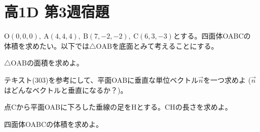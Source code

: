 \documentclass[dvipdfmx,uplatex,b5paper]{jsarticle}
\begin{document}
\section*{高1D 第3週宿題}
$\text{O}(0,0,0),\ \text{A}(4,4,4),\ \text{B}(7,-2,-2),\ \text{C}(6,3,-3)$とする。四面体OABCの
体積を求めたい。以下では$\triangle\text{OAB}$を底面とみて考えることにする。
\begin{enumarabicp}
  \item $\triangle\text{OAB}$の面積を求めよ。
  \item テキスト(303)を参考にして、平面OABに垂直な単位ベクトル$\overrightarrow{n}$を一つ求めよ
  ($\overrightarrow{n}$はどんなベクトルと垂直になるか？)。
  \item 点Cから平面OABに下ろした垂線の足をHとする。CHの長さを求めよ。
  \item 四面体OABCの体積を求めよ。
\end{enumarabicp}
\end{document}
